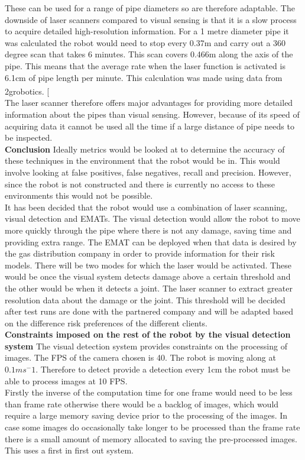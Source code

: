 \documentclass[11pt]{article}		%
\newcommand{\supercite}[1]{\textsuperscript{\cite{#1}}}		%
\begin{document}
	        These can be used for a range of pipe diameters so are therefore adaptable. The downside of laser scanners compared to visual sensing is that it is a slow process to acquire detailed high-resolution information. 
	        For a 1 metre diameter pipe it was calculated the robot would need to stop every 0.37m and carry out a 360 degree scan that takes 6 minutes. 
	        This scan covers 0.466m along the axis of the pipe. 
	        This means that the average rate when the laser function is activated is 6.1cm of pipe length per minute. 
	        This calculation was made using data from 2grobotics.\supercite{2g_robotics} [  
	        \\
	        The laser scanner therefore offers major advantages for providing more detailed information about the pipes than visual sensing. 
	        However, because of its speed of acquiring data it cannot be used all the time if a large distance of pipe needs to be inspected.
	        \\
	        \textbf{Conclusion}
	        Ideally metrics would be looked at to determine the accuracy of these techniques in the environment that the robot would be in. 
	        This would involve looking at false positives, false negatives, recall and precision.
	        However, since the robot is not constructed and there is currently no access to these environments this would not be possible.
	        \\
	        It has been decided that the robot would use a combination of laser scanning, visual detection and EMATs.
	        The visual detection would allow the robot to move more quickly through the pipe where there is not any damage, saving time and providing extra range. 
	        The EMAT can be deployed when that data is desired by the gas distribution company in order to provide information for their risk models. 
	        There will be two modes for which the laser would be activated. These would be once the visual system detects damage  above a certain threshold and the other would be when it detects a joint. The laser scanner to extract greater resolution data about the damage or the joint. 
	        This threshold will be decided after test runs are done with the partnered company and will be adapted based on the difference risk preferences of the different clients.
	    	\\
	        \textbf{Constraints imposed on the rest of the robot by the visual detection system}
	        The visual detection system provides constraints on the processing of images. The FPS of the camera chosen is 40.
	        The robot is moving along at $0.1ms^-1$. 
	        Therefore to detect provide a detection every 1cm the robot must be able to process images at 10 FPS.
	        \\
	        Firstly the inverse of the computation time for one frame would need to be less than frame rate otherwise there would be a backlog of images, which would require a large memory saving device prior to the processing of the images. 
	        In case some images do occasionally take longer to be processed than the frame rate there is a small amount of memory allocated to saving the pre-processed images. 
	        This uses a first in first out system.
\end{document}
